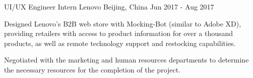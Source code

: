 \begin{cventries}
    \cventry
    {UI/UX Engineer Intern} %
    {Lenovo} %
    {Beijing, China} %
    {Jun 2017 - Aug 2017} %
    {
      \begin{cvitems} %
        \item {Designed Lenovo's B2B web store with Mocking-Bot (similar to Adobe XD), providing retailers with access to product information for over a thousand products, as well as remote technology support and restocking capabilities.}
        \item {Negotiated with the marketing and human resources departments to determine the necessary resources for the completion of the project.}
      \end{cvitems}
    }
    
    

\end{cventries}
